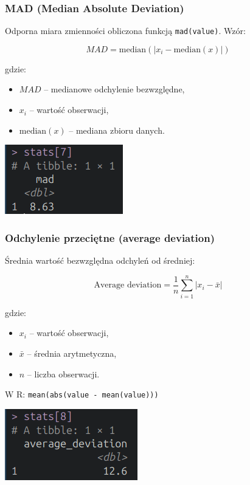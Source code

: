 \documentclass[polish]{article}
\begin{document}
    \subsubsection{MAD (Median Absolute Deviation)}

    Odporna miara zmienności obliczona funkcją \texttt{mad(value)}. Wzór:

    \large
    \[
    MAD = \text{median}(|x_i - \text{median}(x)|)
    \]
    \normalsize

    \noindent gdzie:
    \begin{itemize}
    \item \( MAD \) -- medianowe odchylenie bezwzględne,
    \item \( x_i \) -- wartość obserwacji,
    \item \( \text{median}(x) \) -- mediana zbioru danych.
    \end{itemize}

    \begin{center}
        \includegraphics{img/mad.png}
    \end{center}

    \subsubsection{Odchylenie przeciętne (average deviation)}

    Średnia wartość bezwzględna odchyleń od średniej:

    \large
    \[
    \text{Average deviation} = \frac{1}{n} \sum_{i=1}^{n} |x_i - \bar{x}|
    \]
    \normalsize

    \noindent gdzie:
    \begin{itemize}
    \item \( x_i \) -- wartość obserwacji,
    \item \( \bar{x} \) -- średnia arytmetyczna,
    \item \( n \) -- liczba obserwacji.
    \end{itemize}

    W R: \texttt{mean(abs(value - mean(value)))}

    \begin{center}
        \includegraphics{img/avgdev.png}
    \end{center}
\end{document}
